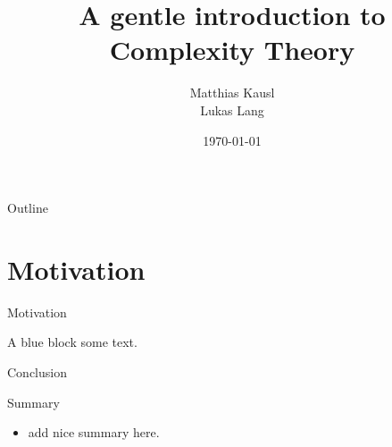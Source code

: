 \documentclass[c]{beamer}
\title{A gentle introduction to Complexity Theory}
\author{Matthias Kausl \\ Lukas Lang}
\institute{Vienna University of Technology}
\date{\today}
\begin{document}
\begin{frame}
\titlepage
\end{frame}

\begin{frame}{Outline}
	\tableofcontents
\end{frame}

\section{Motivation}

\begin{frame}{Motivation}
          
	\begin{block}{A blue block}
		some text.
          \end{block}
\end{frame}

\begin{frame}{Conclusion}
	\begin{block}{Summary}
		\begin{itemize}
			\item add nice summary here.
		\end{itemize}
	\end{block}
\end{frame}
\end{document}
